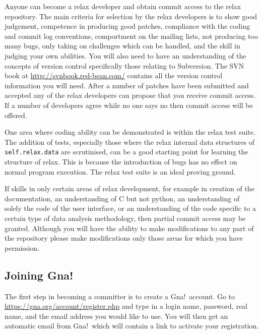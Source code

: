Anyone can become a relax developer and obtain commit access to the relax repository.  The main criteria for selection by the relax developers is to show good judgement, competence in producing good patches, compliance with the coding and commit log conventions, comportment on the mailing lists, not producing too many bugs, only taking on challenges which can be handled, and the skill in judging your own abilities.  You will also need to have an understanding of the concepts of version control specifically those relating to Subversion.  The SVN book at \href{http://svnbook.red-bean.com/}{http://svnbook.red-bean.com/} contains all the version control information you will need.  After a number of patches have been submitted and accepted any of the relax developers can propose that you receive commit access.  If a number of developers agree while no one says no then commit access will be offered.

One area where coding ability can be demonstrated is within the relax test suite.  The addition of tests, especially those where the relax internal data structures of \texttt{self.relax.data} are scrutinised, can be a good starting point for learning the structure of relax.  This is because the introduction of bugs has no effect on normal program execution.  The relax test suite is an ideal proving ground.

If skills in only certain areas of relax development, for example in creation of the documentation, an understanding of C but not python, an understanding of solely the code of the user interface, or an understanding of the code specific to a certain type of data analysis methodology, then partial commit access may be granted.  Although you will have the ability to make modifications to any part of the repository please make modifications only those areas for which you have permission.



\subsection{Joining Gna!}

The first step in becoming a committer is to create a Gna!\ account.  Go to \href{https://gna.org/account/register.php}{https://gna.org/account/register.php} and type in a login name, password, real name, and the email address you would like to use.  You will then get an automatic email from Gna!\ which will contain a link to activate your registration.



